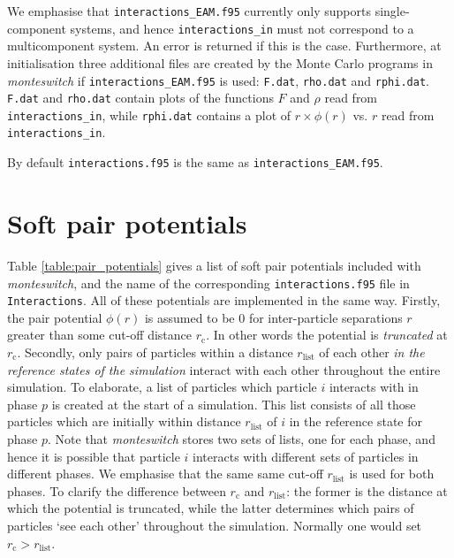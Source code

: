 \documentclass{report}
\begin{document}
We emphasise that \texttt{interactions\_EAM.f95} currently only supports single-component systems, and hence \texttt{interactions\_in} must 
not correspond to a multicomponent system. An error is returned if this is the case. Furthermore, at initialisation three additional files are 
created by the
Monte Carlo programs in \emph{monteswitch} if \texttt{interactions\_EAM.f95} is used: \texttt{F.dat}, \texttt{rho.dat} and \texttt{rphi.dat}. 
\texttt{F.dat} and \texttt{rho.dat} contain plots of the functions $F$ and $\rho$ read from \texttt{interactions\_in}, while 
\texttt{rphi.dat} contains a plot of $r\times\phi(r)$ vs. $r$ read from \texttt{interactions\_in}. 

By default \texttt{interactions.f95} is the same as \texttt{interactions\_EAM.f95}.

\section{Soft pair potentials}\label{section:pair_potentials}
Table \ref{table:pair_potentials} gives a list of soft pair potentials included with \emph{monteswitch}, and the name 
of the corresponding \texttt{interactions.f95} file in \texttt{Interactions}. All of these potentials are implemented in the same way.
Firstly, the pair potential $\phi(r)$ is assumed to be 0 for inter-particle separations $r$ greater than some cut-off distance $r_{\text{c}}$. In other
words the potential is \emph{truncated} at $r_{\text{c}}$.
Secondly, only pairs of particles within a distance $r_{\text{list}}$ of each other \emph{in the reference states of the simulation} interact
with each other throughout the entire simulation. To elaborate, a list of particles which particle $i$ interacts with in phase $p$ is created at 
the start of a simulation. This list consists of all those particles which are initially within distance $r_{\text{list}}$ of $i$ in the reference
state for phase $p$. Note that \emph{monteswitch} stores two sets of lists, one for each phase, and hence it is possible that particle $i$ interacts
with different sets of particles in different phases. We emphasise that the same same cut-off $r_{\text{list}}$ is used for both phases.
To clarify the difference between $r_{\text{c}}$ and $r_{\text{list}}$: the former is the distance at which the potential is truncated, while
the latter determines which pairs of particles `see each other' throughout the simulation. Normally one would set $r_{\text{c}}>r_{\text{list}}$.
\end{document}

